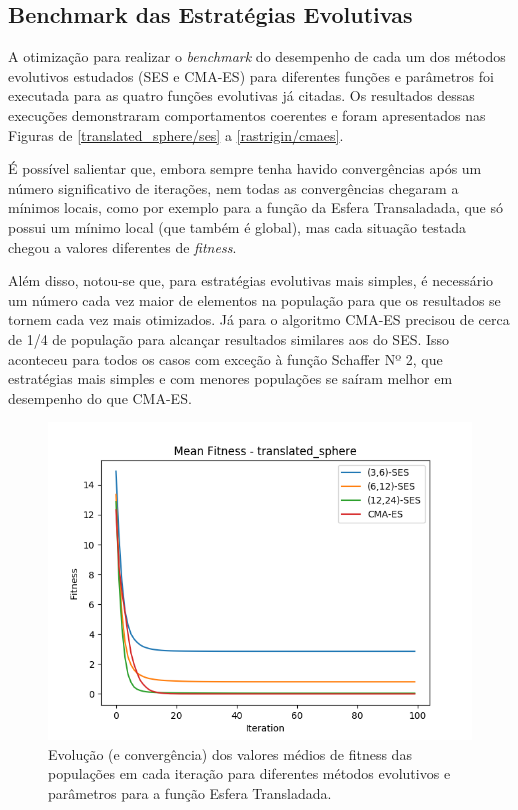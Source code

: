 \documentclass[conference]{IEEEtran}
\begin{document}
\subsection{Benchmark das Estratégias Evolutivas}

A otimização para realizar o \textit{benchmark} do desempenho de cada um dos métodos evolutivos estudados (SES e CMA-ES) para diferentes funções e parâmetros foi executada para as quatro funções evolutivas já citadas. Os resultados dessas execuções demonstraram comportamentos coerentes e foram apresentados nas Figuras de \ref{translated_sphere/ses} a \ref{rastrigin/cmaes}.

É possível salientar que, embora sempre tenha havido convergências após um número significativo de iterações, nem todas as convergências chegaram a mínimos locais, como por exemplo para a função da Esfera Transaladada, que só possui um mínimo local (que também é global), mas cada situação testada chegou a valores diferentes de \textit{fitness}.

Além disso, notou-se que, para estratégias evolutivas mais simples, é necessário um número cada vez maior de elementos na população para que os resultados se tornem cada vez mais otimizados. Já para o algoritmo CMA-ES precisou de cerca de 1/4 de população para alcançar resultados similares aos do SES. Isso aconteceu para todos os casos com exceção à função Schaffer Nº 2, que estratégias mais simples e com menores populações se saíram melhor em desempenho do que CMA-ES.

\begin{figure}[htbp]
\centering
\centerline{\includegraphics[scale=0.5]{imagens/translated_sphere/mean_fitness.png}}
\caption{Evolução (e convergência) dos valores médios de fitness das populações em cada iteração para diferentes métodos evolutivos e parâmetros para a função Esfera Transladada.}
\label{translated_sphere/mean_fitness}
\end{figure}
\end{document}
